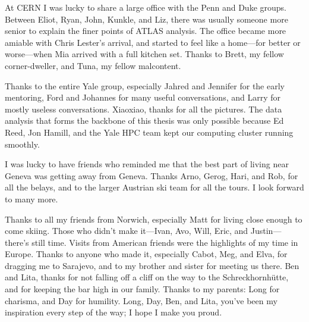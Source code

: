 At CERN I was lucky to share a large office with the Penn and Duke groups.
Between Eliot, Ryan, John, Kunkle, and Liz, there was usually someone more senior to explain the finer points of ATLAS analysis.
The office became more amiable with Chris Lester's arrival, and started to feel like a home---for better or worse---when Mia arrived with a full kitchen set.
Thanks to Brett, my fellow corner-dweller, and Tuna, my fellow malcontent.

Thanks to the entire Yale group, especially Jahred and Jennifer for the early mentoring, Ford and Johannes for many useful conversations, and Larry for mostly useless conversations. Xiaoxiao, thanks for all the pictures.
The data analysis that forms the backbone of this thesis was only possible because Ed Reed, Jon Hamill, and the Yale HPC team kept our computing cluster running smoothly.


I was lucky to have friends who reminded me that the best part of living near Geneva was getting away from Geneva.
Thanks Arno, Gerog, Hari, and Rob, for all the belays, and to the larger Austrian ski team for all the tours. I look forward to many more.

Thanks to all my friends from Norwich, especially Matt for living close enough to come skiing. Those who didn't make it---Ivan, Avo, Will, Eric, and Justin---there's still time.
Visits from American friends were the highlights of my time in Europe. Thanks to anyone who made it, especially Cabot, Meg, and Elva, for dragging me to Sarajevo, and to my brother and sister for meeting us there. Ben and Lita, thanks for not falling off a cliff on the way to the Schreckhornh\"utte, and for keeping the bar high in our family.
Thanks to my parents: Long for charisma, and Day for humility.
Long, Day, Ben, and Lita, you've been my inspiration every step of the way; I hope I make you proud.

